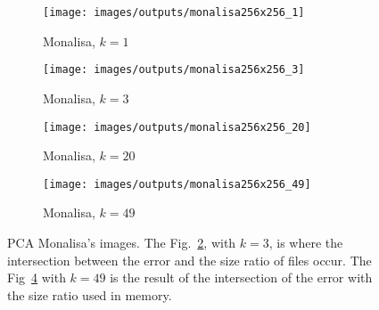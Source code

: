\documentclass[journal]{IEEEtran}
\begin{document}
\begin{figure}
	\centering
	\begin{subfigure}{0.23\textwidth}
		\centering
		\texttt{[image: images/outputs/monalisa256x256\_1]} 
		\caption{Monalisa, $k=1$}
		\label{fig:outputs:monalisa_1} 
	\end{subfigure}
	\centering
	\begin{subfigure}{0.23\textwidth}
		\centering
		\texttt{[image: images/outputs/monalisa256x256\_3]} 
		\caption{Monalisa, $k=3$}
		\label{fig:outputs:monalisa_3} 
	\end{subfigure}

	\centering
	\begin{subfigure}{0.23\textwidth}
		\centering
		\texttt{[image: images/outputs/monalisa256x256\_20]} 
		\caption{Monalisa, $k=20$}
		\label{fig:outputs:monalisa_20} 
	\end{subfigure}
	\centering
	\begin{subfigure}{0.23\textwidth}
		\centering
		\texttt{[image: images/outputs/monalisa256x256\_49]} 
		\caption{Monalisa, $k=49$}
		\label{fig:outputs:monalisa_49} 
	\end{subfigure}
	
	
	\caption{PCA Monalisa's images. The Fig.~\ref{fig:outputs:monalisa_3}, with $k=3$, is where the intersection between the error and the size ratio of files occur. The Fig~\ref{fig:outputs:monalisa_49} with $k=49$ is the result of the intersection of the error with the size ratio used in memory.}
	\label{fig:outputs:monalisa}
\end{figure}
\end{document}
